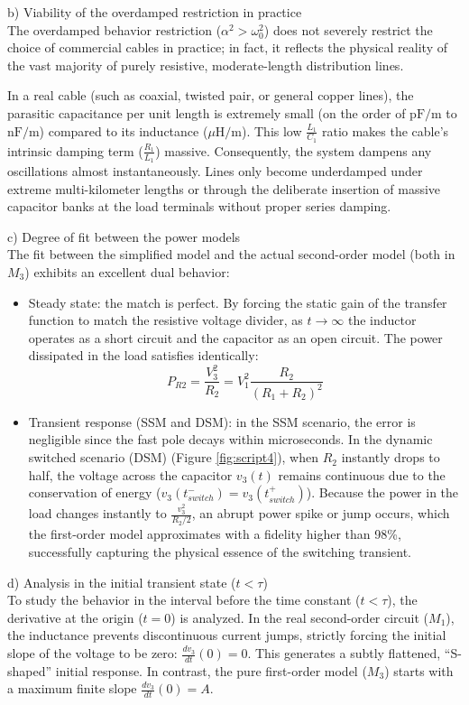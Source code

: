 \documentclass[11pt, a4paper]{article}
\begin{document}
\medskip\noindent
b) Viability of the overdamped restriction in practice\\
The overdamped behavior restriction ($\alpha^2 > \omega_0^2$) does not severely restrict the choice of commercial cables in practice; in fact, it reflects the physical reality of the vast majority of purely resistive, moderate-length distribution lines.

In a real cable (such as coaxial, twisted pair, or general copper lines), the parasitic capacitance per unit length is extremely small (on the order of $\text{pF/m}$ to $\text{nF/m}$) compared to its inductance ($\mu\text{H/m}$). This low $\frac{L_1}{C_1}$ ratio makes the cable's intrinsic damping term ($\frac{R_1}{L_1}$) massive. Consequently, the system dampens any oscillations almost instantaneously. Lines only become underdamped under extreme multi-kilometer lengths or through the deliberate insertion of massive capacitor banks at the load terminals without proper series damping.

\medskip\noindent
c) Degree of fit between the power models\\
The fit between the simplified model and the actual second-order model (both in $M_3$) exhibits an excellent dual behavior:
\begin{itemize}
    \item Steady state: the match is perfect. By forcing the static gain of the transfer function to match the resistive voltage divider, as $t \to \infty$ the inductor operates as a short circuit and the capacitor as an open circuit. The power dissipated in the load satisfies identically:
    \[ P_{R2} = \frac{V_3^2}{R_2} = V_1^2 \frac{R_2}{(R_1 + R_2)^2} \]
    \item Transient response (SSM and DSM): in the SSM scenario, the error is negligible since the fast pole decays within microseconds. In the dynamic switched scenario (DSM) (Figure \ref{fig:script4}), when $R_2$ instantly drops to half, the voltage across the capacitor $v_3(t)$ remains continuous due to the conservation of energy ($v_3(t_{switch}^-) = v_3(t_{switch}^+)$). Because the power in the load changes instantly to $\frac{v_3^2}{R_2/2}$, an abrupt power spike or jump occurs, which the first-order model approximates with a fidelity higher than 98\%, successfully capturing the physical essence of the switching transient.
\end{itemize}

\medskip\noindent
d) Analysis in the initial transient state ($t < \tau$) \\
To study the behavior in the interval before the time constant ($t < \tau$), the derivative at the origin ($t=0$) is analyzed.
In the real second-order circuit ($M_1$), the inductance prevents discontinuous current jumps, strictly forcing the initial slope of the voltage to be zero: $\frac{dv_3}{dt}(0) = 0$. This generates a subtly flattened, ``S-shaped'' initial response. In contrast, the pure first-order model ($M_3$) starts with a maximum finite slope $\frac{dv_3}{dt}(0) = A$.
\end{document}
